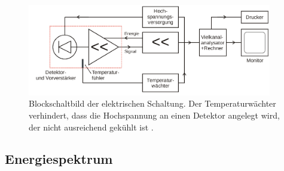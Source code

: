     \begin{figure}
      \centering
      \includegraphics[width=0.95\textwidth]{blockschaltung.png}
      \caption{Blockschaltbild der elektrischen Schaltung. Der Temperaturwächter verhindert, dass die Hochspannung
      an einen Detektor angelegt wird, der nicht ausreichend gekühlt ist \cite{anleitungv18}.}
      \label{fig:blockschaltbild}
    \end{figure}

    \subsection{Energiespektrum}

